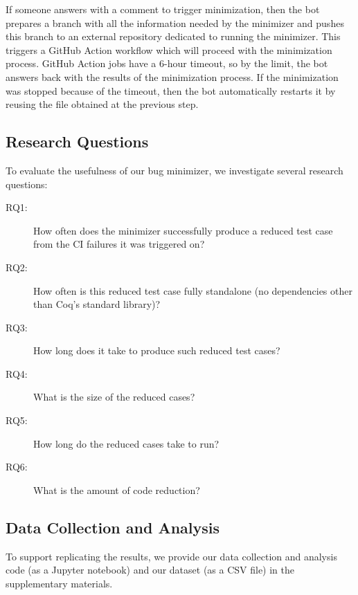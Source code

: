 \documentclass[a4paper,USenglish,cleveref,autoref,thm-restate]{lipics-v2021}
\begin{document}
If someone answers with a comment to trigger minimization, then the bot prepares a branch with all the information needed by the minimizer and pushes this branch to an external repository dedicated to running the minimizer. This triggers a GitHub Action workflow which will proceed with the minimization process. GitHub Action jobs have a 6-hour timeout, so by the limit, the bot answers back with the results of the minimization process. If the minimization was stopped because of the timeout, then the bot automatically restarts it by reusing the file obtained at the previous step.

\subsection{Research Questions}

To evaluate the usefulness of our bug minimizer, we investigate several research questions:

\begin{description}
\item[RQ1:] How often does the minimizer successfully produce a reduced test case from the CI failures it was triggered on?
\item[RQ2:] How often is this reduced test case fully standalone (no dependencies other than Coq's standard library)?
\item[RQ3:] How long does it take to produce such reduced test cases?
\item[RQ4:] What is the size of the reduced cases?
\item[RQ5:] How long do the reduced cases take to run?
\item[RQ6:] What is the amount of code reduction?
\end{description}

\subsection{Data Collection and Analysis}

To support replicating the results, we provide our data collection and analysis code (as a Jupyter notebook) and our dataset (as a CSV file) in the supplementary materials.
\end{document}
